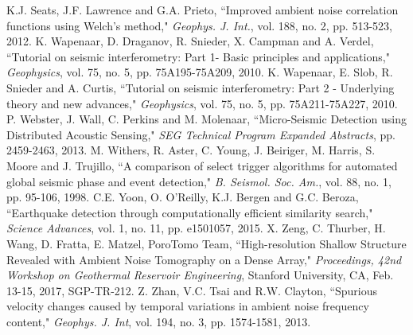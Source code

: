 \documentclass[11pt]{article}
\begin{document}
\begin{thebibliography}{30}
\vspace{-0.2cm}
 K.J. Seats, J.F. Lawrence and G.A. Prieto, ``Improved ambient noise correlation functions using Welch's method," \textit{Geophys. J. Int.}, vol. 188, no. 2, pp. 513-523, 2012.
\vspace{-0.2cm}
 K. Wapenaar, D. Draganov, R. Snieder, X. Campman and A. Verdel, ``Tutorial on seismic interferometry: Part 1- Basic principles and applications," \textit{Geophysics}, vol. 75, no. 5, pp. 75A195-75A209, 2010.
\vspace{-0.6cm}
 K. Wapenaar, E. Slob, R. Snieder and A. Curtis, ``Tutorial on seismic interferometry: Part 2 - Underlying theory and new advances," \textit{Geophysics}, vol. 75, no. 5, pp. 75A211-75A227, 2010.
\vspace{-0.2cm}
 P. Webster, J. Wall, C. Perkins and M. Molenaar, ``Micro-Seismic Detection using Distributed Acoustic Sensing," \textit{SEG Technical Program Expanded Abstracts}, pp. 2459-2463, 2013.
\vspace{-0.2cm}
 M. Withers, R. Aster, C. Young, J. Beiriger, M. Harris, S. Moore and J. Trujillo, ``A comparison of select trigger algorithms for automated global seismic phase and event detection," \textit{B. Seismol. Soc. Am.}, vol. 88, no. 1, pp. 95-106, 1998.
\vspace{-0.2cm}
 C.E. Yoon, O. O'Reilly, K.J. Bergen and G.C. Beroza, ``Earthquake detection through computationally efficient similarity search," \textit{Science Advances}, vol. 1, no. 11, pp. e1501057, 2015.
\vspace{-0.2cm}
 X. Zeng, C. Thurber, H. Wang, D. Fratta, E. Matzel, PoroTomo Team, ``High-resolution Shallow Structure Revealed with Ambient Noise Tomography on a Dense Array," \textit{Proceedings, 42nd Workshop on Geothermal Reservoir Engineering}, Stanford University, CA, Feb. 13-15, 2017, SGP-TR-212.
\vspace{-0.2cm}
 Z. Zhan, V.C. Tsai and R.W. Clayton, ``Spurious velocity changes caused by temporal variations in ambient noise frequency content," \textit{Geophys. J. Int}, vol. 194, no. 3, pp. 1574-1581, 2013.

\end{thebibliography}
\endgroup
\end{document}
